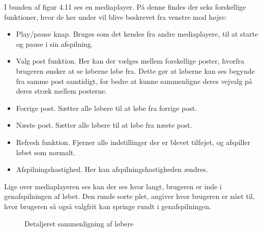 I bunden af figur 4.11 ses en mediaplayer. På denne findes der seks forskellige funktioner, hvor de her under vil blive beskrevet fra venstre mod højre: 
\begin{itemize}
	\item Play/pause knap. Bruges som det kendes fra andre mediaplayere, til at starte og pause i sin afspilning.
	\item Valg post funktion. Her kan der vælges mellem forskellige poster, hvorfra brugeren ønsker at se løberne løbe fra. Dette gør at løberne kan ses begynde fra samme post samtidigt, for bedre at kunne sammenligne deres vejvalg på deres stræk mellem posterne.
	\item Forrige post. Sætter alle løbere til at løbe fra forrige post.
	\item Næste post. Sætter alle løbere til at løbe fra næste post.
	\item Refresh funktion. Fjerner alle indstillinger der er blevet tilføjet, og afspiller løbet som normalt.
	\item Afspilningshastighed. Her kan afspilningshastigheden ændres.
\end{itemize}
Lige over mediaplayeren ses kan der ses hvor langt, brugeren er inde i genafspilningen af løbet. Den runde sorte plet, angiver hvor brugeren er nået til, hvor brugeren så også valgfrit kan springe rundt i genafspilningen.

\begin{figure}[h]
	\centering
	\caption{Detaljeret sammenligning af løbere}
\end{figure}

